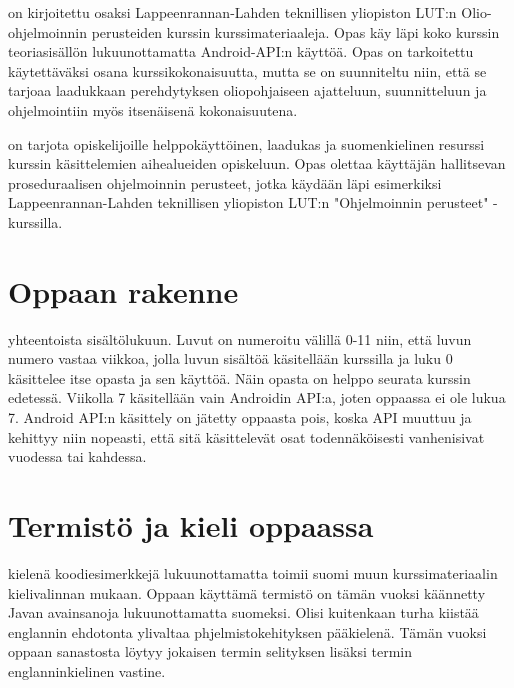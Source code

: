 \documentclass[a4paper,justified,notoc]{tufte-book}
\newcommand{\lutin}{Lappeenrannan-Lahden teknillisen yliopiston LUT:n }
\begin{document}
\begin{fullwidth}
 on kirjoitettu osaksi \lutin Olio-ohjelmoinnin perusteiden kurssin
kurssimateriaaleja. Opas käy läpi koko kurssin  teoriasisällön lukuunottamatta Android-API:n
käyttöä. Opas on tarkoitettu käytettäväksi osana kurssikokonaisuutta, mutta se on suunniteltu
niin, että se tarjoaa laadukkaan perehdytyksen oliopohjaiseen ajatteluun, suunnitteluun ja
ohjelmointiin myös itsenäisenä kokonaisuutena.

 on tarjota opiskelijoille helppokäyttöinen,
laadukas ja suomenkielinen resurssi kurssin käsittelemien aihealueiden
opiskeluun. Opas olettaa käyttäjän hallitsevan proseduraalisen ohjelmoinnin
perusteet, jotka käydään läpi esimerkiksi \lutin "Ohjelmoinnin perusteet" 
-kurssilla.


\section{Oppaan rakenne}
\label{rakenteesta}

 yhteentoista sisältölukuun. Luvut on numeroitu välillä 0-11 niin, että
luvun numero vastaa viikkoa, jolla luvun sisältöä käsitellään kurssilla ja luku 0 käsittelee itse
opasta ja sen käyttöä. Näin opasta on helppo seurata kurssin edetessä. Viikolla 7 käsitellään vain
Androidin API:a, joten oppaassa ei ole lukua 7. Android API:n käsittely on jätetty oppaasta pois,
koska API muuttuu ja kehittyy niin nopeasti, että sitä käsittelevät osat todennäköisesti
vanhenisivat vuodessa tai kahdessa.


\section{Termistö ja kieli oppaassa}
\label{kielestä}

 kielenä koodiesimerkkejä lukuunottamatta toimii suomi muun
kurssimateriaalin kielivalinnan mukaan. Oppaan käyttämä termistö on tämän vuoksi käännetty Javan
avainsanoja lukuunottamatta suomeksi. Olisi kuitenkaan turha kiistää englannin ehdotonta ylivaltaa
phjelmistokehityksen pääkielenä. Tämän vuoksi oppaan sanastosta löytyy jokaisen termin
selityksen lisäksi termin englanninkielinen vastine.


\end{fullwidth}
\end{document}
